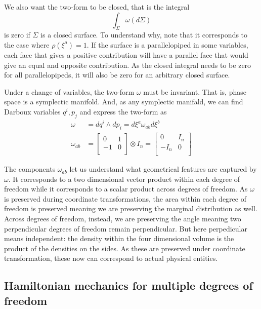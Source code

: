 \documentclass[11pt]{article}
\begin{document}
We also want the two-form to be closed, that is the integral
\begin{equation}
\int_\Sigma \omega(d\Sigma)
\end{equation}
is zero if $\Sigma$ is a closed surface. To understand why, note that it corresponds to the case where $\rho(\xi^a)=1$. If the surface is a parallelopiped in some variables, each face that gives a positive contribution will have a parallel face that would give an equal and opposite contribution. As the closed integral needs to be zero for all parallelopipeds, it will also be zero for an arbitrary closed surface.

Under a change of variables, the two-form $\omega$ must be invariant. That is, phase space is a symplectic manifold. And, as any symplectic manifald, we can find Darboux variables $q^i, p_j$ and express the two-form as
\begin{equation}
\label{Symplectic}
\begin{aligned}
\omega &= dq^i \wedge dp_i = d\xi^a\omega_{ab}d\xi^b \\
\omega_{ab} &=  \left[
\begin{array}{cc}
0 & 1 \\
-1 & 0 \\
\end{array}
\right] \otimes I_n =
\left[
\begin{array}{cc}
0 & I_n \\
-I_n & 0 \\
\end{array}
\right]
\end{aligned}
\end{equation}

The components $\omega_{ab}$ let us understand what geometrical features are captured by $\omega$. It corresponds to a two dimensional vector product within each degree of freedom while it corresponds to a scalar product across degrees of freedom. As $\omega$ is preserved during coordinate transformations, the area within each degree of freedom is preserved meaning we are preserving the marginal distribution as well. Across degrees of freedom, instead, we are preserving the angle meaning two perpendicular degrees of freedom remain perpendicular. But here perpedicular means independent: the density within the four dimensional volume is the product of the densities on the sides. As these are preserved under coordinate transformation, these now can correspond to actual physical entities.

\subsection*{Hamiltonian mechanics for multiple degrees of freedom}
\end{document}
